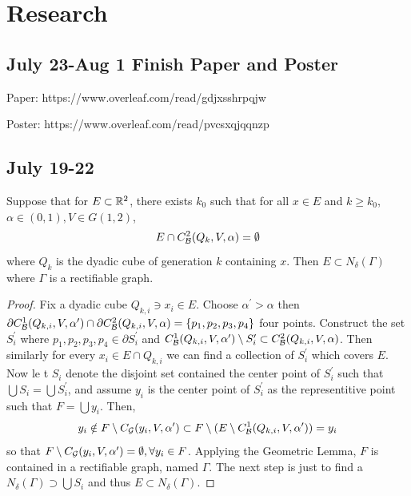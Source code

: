 \section{Research}

\subsection{July 23-Aug 1 Finish Paper and Poster}

Paper: https://www.overleaf.com/read/gdjxsshrpqjw

Poster: https://www.overleaf.com/read/pvcsxqjqqnzp



\subsection{July 19-22}
\begin{lemma}
    Suppose that for $E\subset \mathbb{R}^2$, there exists $k_0$ such that for all $x\in E$ and $k\geq k_0$, $\alpha\in(0,1), V\in G(1,2)$,
    \begin{equation*}
        E\cap C_\mathcal B^2(Q_k, V, \alpha) = \emptyset
    \end{equation*}
    where $Q_k$ is the dyadic cube of generation $k$ containing $x$. Then $E\subset N_\delta(\Gamma)$ where $\Gamma$ is a rectifiable graph. 
\end{lemma}
\begin{proof}
    Fix a dyadic cube $Q_{k,i}\ni x_i\in E$. Choose $\alpha^\prime>\alpha$ then $\partial C_\mathcal B^1(Q_{k,i}, V, \alpha^\prime) \cap \partial C_\mathcal B^2(Q_{k,i}, V, \alpha) = \{p_1, p_2, p_3, p_4\}$ four points.
    Construct the set $S_i^\prime$ where $p_1, p_2, p_3, p_4\in \partial S_i^\prime$ and $C_\mathcal B^1(Q_{k,i}, V, \alpha^\prime)\setminus S_i^\prime \subset C_\mathcal B^2(Q_{k,i}, V, \alpha) $. Then similarly for every $x_i\in E\cap Q_{k,i}$ we can find a collection of $S_i^\prime$ which covers $E$. Now le t $S_i$ denote the disjoint set contained the center point of $S_i^\prime$ such that $\bigcup S_i = \bigcup S_i^\prime$, and assume $y_i$ is the center point of $S_i^\prime$ as the representitive point such that $F = \bigcup y_i$. Then, 
    \begin{equation*}
        y_i\notin F\setminus C_\mathcal G(y_i, V, \alpha^\prime)\subset F\setminus( E\setminus C_\mathcal B^1(Q_{k,i}, V, \alpha^\prime)) = y_i
    \end{equation*}
    so that $F\setminus C_\mathcal G(y_i, V, \alpha^\prime) = \emptyset, \forall y_i\in F$. Applying the Geometric Lemma, $F$ is contained in a rectifiable graph, named $\Gamma$. The next step is just to find a $N_\delta(\Gamma) \supset \bigcup S_i$ and thus $E\subset N_\delta(\Gamma)$.
\end{proof}


